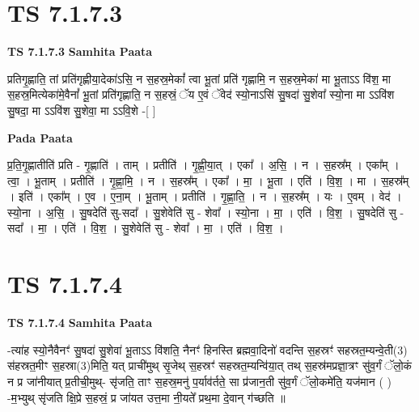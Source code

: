 \documentclass[17pt]{extarticle}
\begin{document}

\section{ TS 7.1.7.3 }

\textbf{TS 7.1.7.3 } \newline
\textbf{Samhita Paata} \newline

प्रतिगृ॒ह्णाति॒ तां प्रति॑गृह्णीया॒देका॑ऽसि॒ न स॒हस्र॒मेकां᳚ त्वा भू॒तां प्रति॑ गृह्णामि॒ न स॒हस्र॒मेका॑ मा भू॒ताऽऽ वि॑श॒ मा स॒हस्र॒मित्येका॑मे॒वैनां᳚ भू॒तां प्रति॑गृह्णाति॒ न स॒हस्रं॒ ॅय ए॒वं ॅवेद॑ स्यो॒नाऽसि॑ सु॒षदा॑ सु॒शेवा᳚ स्यो॒ना मा ऽऽवि॑श सु॒षदा॒ मा ऽऽवि॑श सु॒शेवा॒ मा ऽऽवि॒शे -[  ] \newline

\textbf{Pada Paata} \newline

प्र॒ति॒गृ॒ह्णातीति॑ प्रति - गृ॒ह्णाति॑ । ताम् । प्रतीति॑ । गृ॒ह्णी॒या॒त् । एका᳚ । अ॒सि॒ । न । स॒हस्र᳚म् । एका᳚म् । त्वा॒ । भू॒ताम् । प्रतीति॑ । गृ॒ह्णा॒मि॒ । न । स॒हस्र᳚म् । एका᳚ । मा॒ । भू॒ता । एति॑ । वि॒श॒ । मा । स॒हस्र᳚म् । इति॑ । एका᳚म् । ए॒व । ए॒ना॒म् । भू॒ताम् । प्रतीति॑ । गृ॒ह्णा॒ति॒ । न । स॒हस्र᳚म् । यः । ए॒वम् । वेद॑ । स्यो॒ना । अ॒सि॒ । सु॒षदेति॑ सु-सदा᳚ । सु॒शेवेति॑ सु - शेवा᳚ । स्यो॒ना । मा॒ । एति॑ । वि॒श॒ । सु॒षदेति॑ सु - सदा᳚ । मा॒ । एति॑ । वि॒श॒ । सु॒शेवेति॑ सु - शेवा᳚ । मा॒ । एति॑ । वि॒श॒ ।  \newline





\section{ TS 7.1.7.4 }

\textbf{TS 7.1.7.4 } \newline
\textbf{Samhita Paata} \newline

-त्या॑ह स्यो॒नैवैनꣳ॑ सु॒षदा॑ सु॒शेवा॑ भू॒ताऽऽ वि॑शति॒ नैनꣳ॑ हिनस्ति ब्रह्मवा॒दिनो॑ वदन्ति स॒हस्रꣳ॑ सहस्रत॒म्यन्वे॒ती(3) स॑हस्रत॒मीꣳ स॒हस्रा(3)मिति॒ यत् प्राची॑मुथ् सृ॒जेथ् स॒हस्रꣳ॑ सहस्रत॒म्यन्वि॑या॒त् तथ् स॒हस्र॑मप्रज्ञा॒त्रꣳ सु॑व॒र्गं ॅलो॒कं न प्र जा॑नीयात् प्र॒तीची॒मुथ्- सृ॑जति॒ ताꣳ स॒हस्र॒मनु॑ प॒र्याव॑र्तते॒ सा प्र॑जान॒ती सु॑व॒र्गं ॅलो॒कमे॑ति॒ यज॑मान ( ) -म॒भ्युथ् सृ॑जति क्षि॒प्रे स॒हस्रं॒ प्र जा॑यत उत्त॒मा नी॒यते᳚ प्रथ॒मा दे॒वान् ग॑च्छति ॥ \newline
\end{document}
